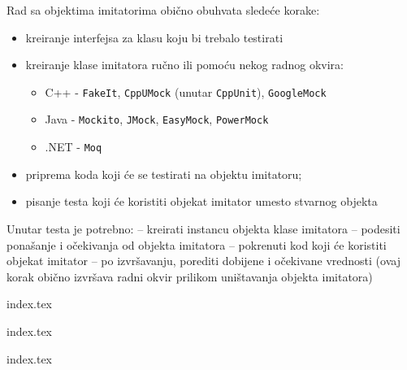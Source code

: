 Rad sa objektima imitatorima obično obuhvata sledeće korake:

\begin{itemize}
\tightlist
\item
  kreiranje interfejsa za klasu koju bi trebalo testirati
\item
  kreiranje klase imitatora ručno ili pomoću nekog radnog okvira:

  \begin{itemize}
  \tightlist
  \item
    C++ - \texttt{FakeIt}, \texttt{CppUMock} (unutar \texttt{CppUnit}), \texttt{GoogleMock}
  \item
    Java - \texttt{Mockito}, \texttt{JMock}, \texttt{EasyMock}, \texttt{PowerMock}
  \item
    .NET - \texttt{Moq}
  \end{itemize}
\item
  priprema koda koji će se testirati na objektu imitatoru;
\item
  pisanje testa koji će koristiti objekat imitator umesto stvarnog objekta
\end{itemize}

Unutar testa je potrebno: -- kreirati instancu objekta klase imitatora -- podesiti ponašanje i očekivanja od objekta imitatora -- pokrenuti kod koji će koristiti objekat imitator -- po izvršavanju, porediti dobijene i očekivane vrednosti (ovaj korak obično izvršava radni okvir prilikom uništavanja objekta imitatora)

{index.tex}

{index.tex}

{index.tex}
